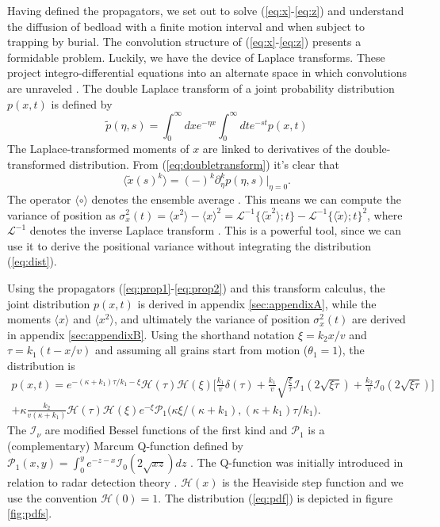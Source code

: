 \documentclass[]{agujournal2018}
\newcommand\be{\begin{equation}}
\newcommand\ee{\end{equation}}
\newcommand\bra{\langle}
\newcommand\ket{\rangle}
\newcommand\El{\mathcal{L}}
\begin{document}
Having defined the propagators, we set out to solve (\ref{eq:x}-\ref{eq:z}) and understand the diffusion of bedload with a finite motion interval and when subject to trapping by burial.
The convolution structure of (\ref{eq:x}-\ref{eq:z}) presents a formidable problem.
Luckily, we have the device of Laplace transforms.
These project integro-differential equations into an alternate space in which convolutions are unraveled \citep[e.g.][]{Arfken1985}.
The double Laplace transform of a joint probability distribution $p(x,t)$ is defined by 
\be \tilde{p}(\eta,s) = \int_0^\infty dx e^{-\eta x}\int_0^\infty dt e^{-st} p(x,t) \label{eq:doubletransform}\ee
The Laplace-transformed moments of $x$ are linked to derivatives of the double-transformed distribution.
From (\ref{eq:doubletransform}) it's clear that
\be \bra \tilde{x}(s)^k \ket = (-)^k\partial_\eta^k p(\eta,s)\Big|_{\eta=0}.\label{eq:momenttrick}\ee
The operator $\bra \circ \ket$ denotes the ensemble average \citep[e.g.][]{Kittel1958}.
This means we can compute the variance of position as $\sigma_x^2(t) = \bra x^2 \ket - \bra x \ket^2 = \El^{-1} \{\bra\tilde{x}^2 \ket;t\} - \El^{-1} \{\bra\tilde{x} \ket;t\}^2$, where $\El^{-1}$ denotes the inverse Laplace transform \citep[e.g.][]{Arfken1985}. This is a powerful tool, since we can use it to derive the positional variance without integrating the distribution (\ref{eq:dist}).


Using the propagators (\ref{eq:prop1}-\ref{eq:prop2}) and this transform calculus, the joint distribution $p(x,t)$ is derived in appendix \ref{sec:appendixA}, while the moments $\bra x \ket$ and $\bra x^2 \ket$, and ultimately the variance of position $\sigma_x^2(t)$ are derived in appendix \ref{sec:appendixB}. Using the shorthand notation $\xi = k_2 x/v$ and $\tau = k_1(t-x/v)$ \citep[c.f.][]{Lisle1998} and assuming all grains start from motion ($\theta_1=1$), the distribution is 
\begin{multline}
p(x,t) = e^{-(\kappa + k_1)\tau/k_1-\xi}\mathcal{H}(\tau)\mathcal{H}(\xi)\Bigg[\frac{k_1}{v}\delta(\tau) + \frac{k_1}{v} \sqrt{\frac{\xi}{\tau}}\mathcal{I}_1(2\sqrt{\xi\tau}) + \frac{k_2}{v} \mathcal{I}_0(2\sqrt{\xi\tau})\Bigg]\\
+ \kappa \frac{k_2}{v(\kappa+k_1)}\mathcal{H}(\tau)\mathcal{H}(\xi)e^{-\xi}\mathcal{P}_1\big(\kappa\xi/(\kappa+k_1), (\kappa+k_1)\tau/k_1\big).
\label{eq:pdf}
\end{multline}
The $\mathcal{I}_\nu$ are modified Bessel functions of the first kind and $\mathcal{P}_1$ is a (complementary) Marcum Q-function defined by $\mathcal{P}_1(x,y) = \int_0^y e^{-z-x}\mathcal{I}_0(2\sqrt{xz})dz $ \citep{Temme1996}. The Q-function was initially introduced in relation to radar detection theory \citep{Marcum1960}. $\mathcal{H}(x)$ is the Heaviside step function and we use the convention $\mathcal{H}(0)=1$.
The distribution (\ref{eq:pdf}) is depicted in figure \ref{fig:pdfs}.
\end{document}
